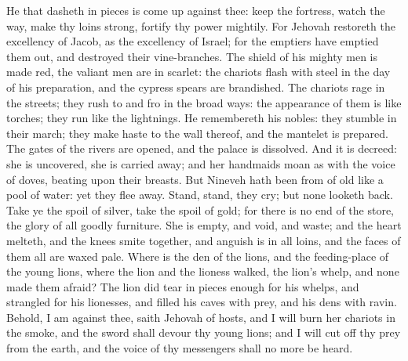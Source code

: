 He that dasheth in pieces is come up against thee: keep the fortress, watch the way, make thy loins strong, fortify thy power mightily. For Jehovah restoreth the excellency of Jacob, as the excellency of Israel; for the emptiers have emptied them out, and destroyed their vine-branches. The shield of his mighty men is made red, the valiant men are in scarlet: the chariots flash with steel in the day of his preparation, and the cypress spears are brandished. The chariots rage in the streets; they rush to and fro in the broad ways: the appearance of them is like torches; they run like the lightnings. He remembereth his nobles: they stumble in their march; they make haste to the wall thereof, and the mantelet is prepared. The gates of the rivers are opened, and the palace is dissolved. And it is decreed: she is uncovered, she is carried away; and her handmaids moan as with the voice of doves, beating upon their breasts.  But Nineveh hath been from of old like a pool of water: yet they flee away. Stand, stand, they cry; but none looketh back. Take ye the spoil of silver, take the spoil of gold; for there is no end of the store, the glory of all goodly furniture. She is empty, and void, and waste; and the heart melteth, and the knees smite together, and anguish is in all loins, and the faces of them all are waxed pale. Where is the den of the lions, and the feeding-place of the young lions, where the lion and the lioness walked, the lion’s whelp, and none made them afraid? The lion did tear in pieces enough for his whelps, and strangled for his lionesses, and filled his caves with prey, and his dens with ravin. Behold, I am against thee, saith Jehovah of hosts, and I will burn her chariots in the smoke, and the sword shall devour thy young lions; and I will cut off thy prey from the earth, and the voice of thy messengers shall no more be heard. 

